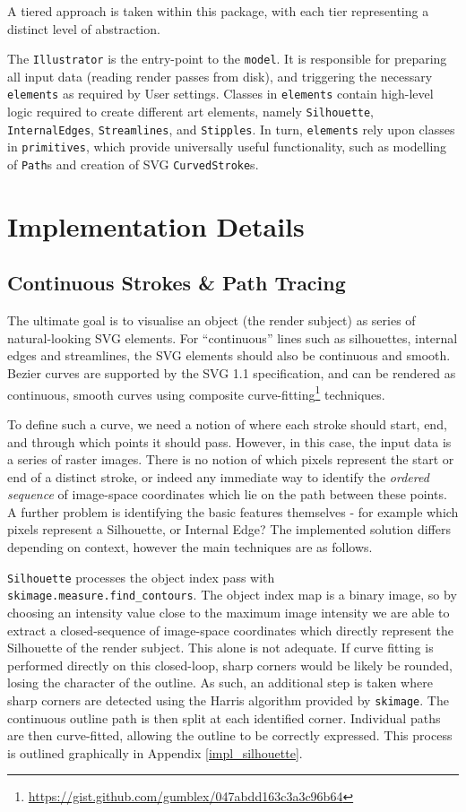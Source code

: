 {A tiered approach is taken within this package, with each tier representing a distinct level of abstraction.

The \texttt{Illustrator} is the entry-point to the \texttt{model}. 
It is responsible for preparing all input data (reading render passes from disk), and triggering the necessary \texttt{elements} as required by User settings.
Classes in \texttt{elements} contain high-level logic required to create different art elements, namely \texttt{Silhouette}, \texttt{InternalEdges}, \texttt{Streamlines}, and \texttt{Stipples}.
In turn, \texttt{elements} rely upon classes in \texttt{primitives}, which provide universally useful functionality, such as modelling of \texttt{Path}s and creation of SVG \texttt{CurvedStroke}s.

\section{Implementation Details}

\subsection{Continuous Strokes \& Path Tracing}

The ultimate goal is to visualise an object (the render subject) as series of natural-looking SVG elements.
For ``continuous'' lines such as silhouettes, internal edges and streamlines, the SVG elements should also be continuous and smooth.
Bezier curves are supported by the SVG 1.1 specification, and can be rendered as continuous, smooth curves using composite curve-fitting\footnote{\url{https://gist.github.com/gumblex/047abdd163c3a3c96b64}} techniques.

To define such a curve, we need a notion of where each stroke should start, end, and through which points it should pass.
However, in this case, the input data is a series of raster images.
There is no notion of which pixels represent the start or end of a distinct stroke, or indeed any immediate way to identify the \emph{ordered sequence} of image-space coordinates which lie on the path between these points. A further problem is identifying the basic features themselves - for example which pixels represent a Silhouette, or Internal Edge? The implemented solution differs depending on context, however the main techniques are as follows.

\texttt{Silhouette} processes the object index pass with \texttt{skimage.measure.find\_contours}.
The object index map is a binary image, so by choosing an intensity value close to the maximum image intensity we are able to extract a closed-sequence of image-space coordinates which directly represent the Silhouette of the render subject.
This alone is not adequate.
If curve fitting is performed directly on this closed-loop, sharp corners would be likely be rounded, losing the character of the outline.
As such, an additional step is taken where sharp corners are detected using the Harris algorithm provided by \texttt{skimage}.
The continuous outline path is then split at each identified corner. Individual paths are then curve-fitted, allowing the outline to be correctly expressed.
This process is outlined graphically in Appendix \ref{impl_silhouette}.

}
